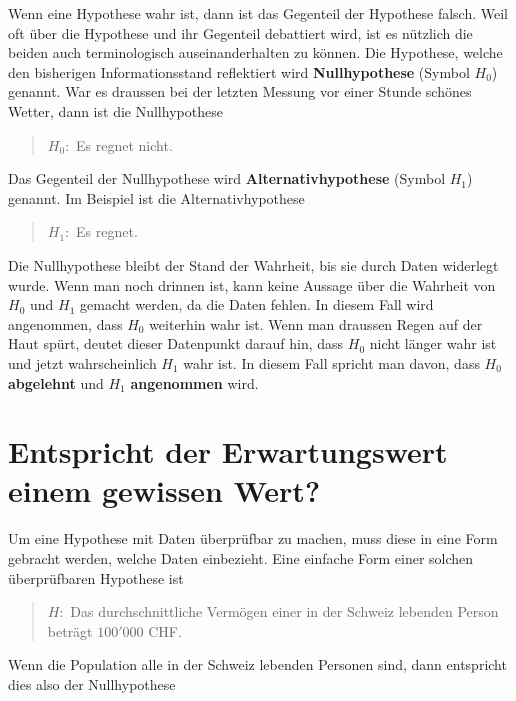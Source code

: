 \documentclass[
]{book}
\theoremstyle{definition}
\theoremstyle{definition}
\theoremstyle{definition}
\theoremstyle{definition}
\theoremstyle{remark}
\begin{document}
Wenn eine Hypothese wahr ist, dann ist das Gegenteil der Hypothese falsch. Weil oft über die Hypothese und ihr Gegenteil debattiert wird, ist es nützlich die beiden auch terminologisch auseinanderhalten zu können. \label{customdef-nullhypothese}{Die Hypothese, welche den bisherigen Informationsstand reflektiert wird \textbf{Nullhypothese} (Symbol \(H_0\)) genannt.} War es draussen bei der letzten Messung vor einer Stunde schönes Wetter, dann ist die Nullhypothese

\begin{quote}
\(H_0:\) Es regnet nicht.
\end{quote}

\label{customdef-alternativhypothese}{Das Gegenteil der Nullhypothese wird \textbf{Alternativhypothese} (Symbol \(H_1\)) genannt.} Im Beispiel ist die Alternativhypothese

\begin{quote}
\(H_1:\) Es regnet.
\end{quote}

Die Nullhypothese bleibt der Stand der Wahrheit, bis sie durch Daten widerlegt wurde. Wenn man noch drinnen ist, kann keine Aussage über die Wahrheit von \(H_0\) und \(H_1\) gemacht werden, da die Daten fehlen. In diesem Fall wird angenommen, dass \(H_0\) weiterhin wahr ist. Wenn man draussen Regen auf der Haut spürt, deutet dieser Datenpunkt darauf hin, dass \(H_0\) nicht länger wahr ist und jetzt wahrscheinlich \(H_1\) wahr ist. In diesem Fall spricht man davon, dass \(H_0\) \textbf{abgelehnt} und \(H_1\) \textbf{angenommen} wird.

\section{Entspricht der Erwartungswert einem gewissen Wert?}\label{entspricht-der-erwartungswert-einem-gewissen-wert}

Um eine Hypothese mit Daten überprüfbar zu machen, muss diese in eine Form gebracht werden, welche Daten einbezieht. Eine einfache Form einer solchen überprüfbaren Hypothese ist

\begin{quote}
\(H:\) Das durchschnittliche Vermögen einer in der Schweiz lebenden Person beträgt \(100'000\) CHF.
\end{quote}

Wenn die Population alle in der Schweiz lebenden Personen sind, dann entspricht dies also der Nullhypothese
\end{document}
